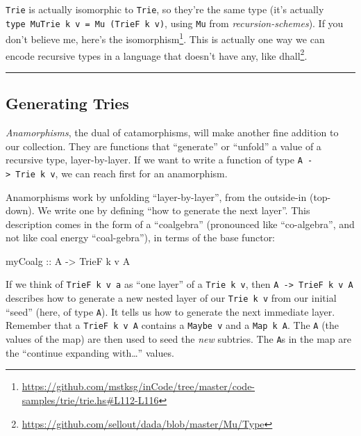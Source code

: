 \documentclass[]{article}
\newenvironment{Shaded}{}{}
\newcommand{\DataTypeTok}[1]{\textcolor[rgb]{0.56,0.13,0.00}{#1}}
\newcommand{\NormalTok}[1]{#1}
\newcommand{\OtherTok}[1]{\textcolor[rgb]{0.00,0.44,0.13}{#1}}
\renewcommand{\href}[2]{#2\footnote{\url{#1}}}
\begin{document}
\texttt{Trie\textquotesingle{}} is actually isomorphic to \texttt{Trie}, so
they're the same type (it's actually
\texttt{type\ MuTrie\ k\ v\ =\ Mu\ (TrieF\ k\ v)}, using \texttt{Mu} from
\emph{recursion-schemes}). If you don't believe me,
\href{https://github.com/mstksg/inCode/tree/master/code-samples/trie/trie.hs\#L112-L116}{here's
the isomorphism}. This is actually one way we can encode recursive types in a
language that doesn't have any, like
\href{https://github.com/sellout/dada/blob/master/Mu/Type}{dhall}.

\begin{center}\rule{0.5\linewidth}{\linethickness}\end{center}

\hypertarget{generating-tries}{%
\subsection{Generating Tries}\label{generating-tries}}

\emph{Anamorphisms}, the dual of catamorphisms, will make another fine addition
to our collection. They are functions that ``generate'' or ``unfold'' a value of
a recursive type, layer-by-layer. If we want to write a function of type
\texttt{A\ -\textgreater{}\ Trie\ k\ v}, we can reach first for an anamorphism.

Anamorphisms work by unfolding ``layer-by-layer'', from the outside-in
(top-down). We write one by defining ``how to generate the next layer''. This
description comes in the form of a ``coalgebra'' (pronounced like
``co-algebra'', and not like coal energy ``coal-gebra''), in terms of the base
functor:

\begin{Shaded}
\begin{Highlighting}[]
\OtherTok{myCoalg ::} \DataTypeTok{A} \OtherTok{->} \DataTypeTok{TrieF}\NormalTok{ k v }\DataTypeTok{A}
\end{Highlighting}
\end{Shaded}

If we think of \texttt{TrieF\ k\ v\ a} as ``one layer'' of a
\texttt{Trie\ k\ v}, then \texttt{A\ -\textgreater{}\ TrieF\ k\ v\ A} describes
how to generate a new nested layer of our \texttt{Trie\ k\ v} from our initial
``seed'' (here, of type \texttt{A}). It tells us how to generate the next
immediate layer. Remember that a \texttt{TrieF\ k\ v\ A} contains a
\texttt{Maybe\ v} and a \texttt{Map\ k\ A}. The \texttt{A} (the values of the
map) are then used to seed the \emph{new} subtries. The \texttt{A}s in the map
are the ``continue expanding with\ldots{}'' values.
\end{document}
